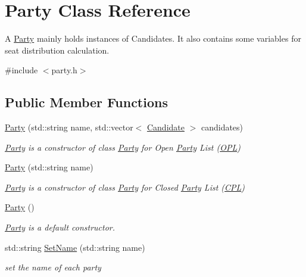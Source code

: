 \hypertarget{classParty}{}\section{Party Class Reference}
\label{classParty}


A \hyperlink{classParty}{Party} mainly holds instances of Candidates. It also contains some variables for seat distribution calculation.  




{\ttfamily \#include $<$party.\+h$>$}

\subsection*{Public Member Functions}
\begin{DoxyCompactItemize}
\item 
\hyperlink{classParty_aab26b5b8dfb95aed33e16938989dc0a5}{Party} (std\+::string name, std\+::vector$<$ \hyperlink{classCandidate}{Candidate} $>$ candidates)
\begin{DoxyCompactList}\small\item\em \hyperlink{classParty}{Party} is a constructor of class \hyperlink{classParty}{Party} for Open \hyperlink{classParty}{Party} List (\hyperlink{classOPL}{O\+PL}) \end{DoxyCompactList}\item 
\hyperlink{classParty_ab7eb172ab879241b8a3d55a6dfff2417}{Party} (std\+::string name)
\begin{DoxyCompactList}\small\item\em \hyperlink{classParty}{Party} is a constructor of class \hyperlink{classParty}{Party} for Closed \hyperlink{classParty}{Party} List (\hyperlink{classCPL}{C\+PL}) \end{DoxyCompactList}\item 
\hyperlink{classParty_a31d77f763e1dc9549532653a4a0dfde5}{Party} ()
\begin{DoxyCompactList}\small\item\em \hyperlink{classParty}{Party} is a default constructor. \end{DoxyCompactList}\item 
std\+::string \hyperlink{classParty_a60969a52220b8358c2b85d7287a565cc}{Set\+Name} (std\+::string name)
\begin{DoxyCompactList}\small\item\em set the name of each party \end{DoxyCompactList}\item 

\end{DoxyCompactItemize}
